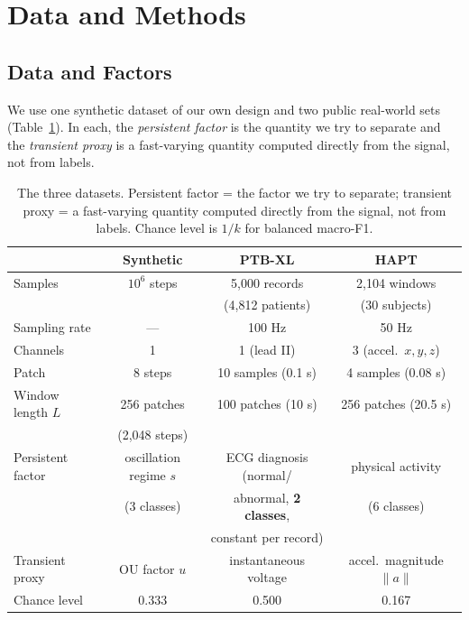\section{Data and Methods}

\subsection{Data and Factors}

We use one synthetic dataset of our own design and two public real-world sets (Table~\ref{tab:datasets}). In each, the \emph{persistent factor} is the quantity we try to separate and the \emph{transient proxy} is a fast-varying quantity computed directly from the signal, not from labels.

\begin{table}[!tbp]
\caption{The three datasets. Persistent factor = the factor we try to separate; transient proxy = a fast-varying quantity computed directly from the signal, not from labels. Chance level is $1/k$ for balanced macro-F1.}
\label{tab:datasets}
\centering
\footnotesize
\begin{tabular}{lccc}
\hline
 & Synthetic & PTB-XL & HAPT \\
\hline
Samples & $10^6$ steps & 5,000 records & 2,104 windows \\
 & & (4,812 patients) & (30 subjects) \\
Sampling rate & --- & 100 Hz & 50 Hz \\
Channels & 1 & 1 (lead II) & 3 (accel.\ $x,y,z$) \\
Patch & 8 steps & 10 samples (0.1 s) & 4 samples (0.08 s) \\
Window length $L$ & 256 patches & 100 patches (10 s) & 256 patches (20.5 s) \\
 & (2,048 steps) & & \\
Persistent factor & oscillation regime $s$ & ECG diagnosis (normal/ & physical activity \\
 & (3 classes) & abnormal, \textbf{2 classes}, & (6 classes) \\
 & & constant per record) & \\
Transient proxy & OU factor $u$ & instantaneous voltage & accel.\ magnitude $\lVert a\rVert$ \\
Chance level & 0.333 & 0.500 & 0.167 \\
\hline
\end{tabular}
\end{table}

